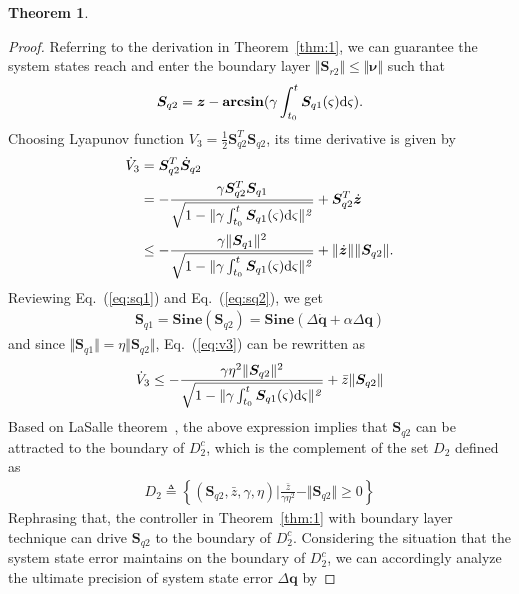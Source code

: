 \documentclass[3p]{elsarticle}
\theoremstyle{plain}
\newtheorem{mythm}{Theorem}
\theoremstyle{remark}
\begin{document}
{\begin{mythm}
\end{mythm}
\begin{proof}
Referring to the derivation in Theorem~\ref{thm:1}, we can guarantee the system states reach and enter the boundary layer $\Vert\bm{ S}_{r2}\Vert \le \Vert\bm\nu\Vert$ such that
\begin{align}
\bm S_{q2}=\bm z-\mathbf{arcsin}(\gamma\int^t_{t_0}\bm S_{q1}(\varsigma) \rm{d}\it{\varsigma}).
\end{align}
Choosing Lyapunov function $V_3=\frac{1}{2}\bm{ S}_{q2}^T\bm{ S}_{q2}$, its time derivative is given by
\begin{align}\begin{split}
\dot V_3&=\bm{ S}_{q2}^T\dot{\bm{S}}_{q2}\\
&=-\frac{\gamma \bm S_{q2}^T\bm S_{q1}}{\sqrt{1-\Vert\gamma\int^t_{t_0}\bm S_{q1}(\varsigma) \rm{d}\it{\varsigma\Vert^2}}}+\bm{ S}_{q2}^T\dot{\bm z}\\
&\le -\frac{\gamma \Vert \bm S_{q1}\Vert^2}{\sqrt{1-\Vert\gamma\int^t_{t_0}\bm S_{q1}(\varsigma) \rm{d}\it{\varsigma\Vert^2}}}+\Vert\dot{\bm{z}}\Vert\Vert\bm{ S}_{q2}\Vert.\label{eq:v3}
\end{split}\end{align}
Reviewing Eq.~(\ref{eq:sq1}) and Eq.~(\ref{eq:sq2}), we get
\begin{align}
\bm S_{q1}=\mathbf{Sine}(\bm S_{q2})=\mathbf{Sine}(\Delta\dot{\bm q}+\alpha\Delta\bm q)
\end{align}
and since $\Vert\bm S_{q1}\Vert=\eta\Vert\bm S_{q2}\Vert$, Eq.~(\ref{eq:v3}) can be rewritten as
\begin{align}
  \dot V_3\le -\frac{\gamma\eta^2 \Vert \bm S_{q2}\Vert^2}{\sqrt{1-\Vert\gamma\int^t_{t_0}\bm S_{q1}(\varsigma) \rm{d}\it{\varsigma\Vert^2}}}+\bar{z}\Vert\bm{ S}_{q2}\Vert
\end{align}
Based on LaSalle theorem~\cite{lasalle1960some}, the above expression implies that $\bm S_{q2}$ can be attracted to the boundary of $D_2^c$, which is the complement of the set $D_2$ defined as
\begin{align}
  D_2\triangleq\left\{(\bm S_{q2},\bar z,\gamma,\eta)\Big\vert \frac{\bar z}{\gamma\eta^2}-\Vert \bm S_{q2}\Vert\ge 0\right\}
\end{align}
Rephrasing that, the controller in Theorem~\ref{thm:1} with boundary layer technique can drive $\bm S_{q2}$ to the boundary of $D_2^c$. Considering the situation that the system state error maintains on the boundary of $D_2^c$, we can accordingly analyze the ultimate precision of system state error $\Delta\bm q$ by

\end{proof}}
\end{document}
